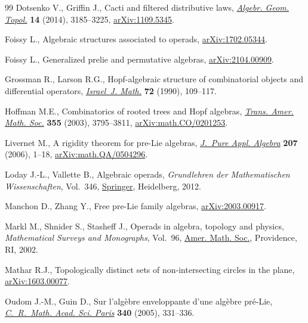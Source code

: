 \begin{thebibliography}{99}
Dotsenko V., Griffin J., Cacti and filtered distributive laws, \href{https://doi.org/10.2140/agt.2014.14.3185}{\textit{Algebr.
 Geom. Topol.}} \textbf{14} (2014), 3185--3225, \href{https://arxiv.org/abs/1109.5345}{arXiv:1109.5345}.

Foissy L., Algebraic structures associated to operads, \href{https://arxiv.org/abs/1702.05344}{arXiv:1702.05344}.

Foissy L., Generalized prelie and permutative algebras, \href{https://arxiv.org/abs/2104.00909}{arXiv:2104.00909}.

Grossman R., Larson R.G., Hopf-algebraic structure of combinatorial objects and
 differential operators, \href{https://doi.org/10.1007/BF02764614}{\textit{Israel~J. Math.}} \textbf{72} (1990),
 109--117.

Hoffman M.E., Combinatorics of rooted trees and {H}opf algebras, \href{https://doi.org/10.1090/S0002-9947-03-03317-8}{\textit{Trans.
 Amer. Math. Soc.}} \textbf{355} (2003), 3795--3811, \href{https://arxiv.org/abs/math.CO/0201253}{arXiv:math.CO/0201253}.

Livernet M., A rigidity theorem for pre-{L}ie algebras, \href{https://doi.org/10.1016/j.jpaa.2005.10.014}{\textit{J.~Pure Appl.
 Algebra}} \textbf{207} (2006), 1--18, \href{https://arxiv.org/abs/math.QA/0504296}{arXiv:math.QA/0504296}.

Loday J.-L., Vallette B., Algebraic operads, \textit{Grundlehren der
 Mathematischen Wissenschaften}, Vol.~346, \href{https://doi.org/10.1007/978-3-642-30362-3}{Springer}, Heidelberg, 2012.

Manchon D., Zhang Y., Free pre-{L}ie family algebras, \href{https://arxiv.org/abs/2003.00917}{arXiv:2003.00917}.

Markl M., Shnider S., Stasheff J., Operads in algebra, topology and physics,
 \textit{Mathematical Surveys and Monographs}, Vol.~96, \href{https://doi.org/10.1090/surv/096}{Amer. Math. Soc.},
 Providence, RI, 2002.

Mathar R.J., Topologically distinct sets of non-intersecting circles in the
 plane, \href{https://arxiv.org/abs/1603.00077}{arXiv:1603.00077}.

Oudom J.-M., Guin D., Sur l'alg\`ebre enveloppante d'une alg\`ebre pr\'e-{L}ie,
 \href{https://doi.org/10.1016/j.crma.2005.01.010}{\textit{C.~R.~Math. Acad. Sci. Paris}} \textbf{340} (2005), 331--336.


\end{thebibliography}
